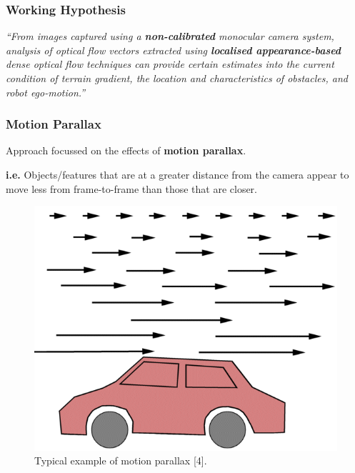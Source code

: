 \documentclass[10pt, compress]{beamer}
\begin{document}

\begin{frame}[fragile]
  \frametitle{Working Hypothesis}

	\hspace*{20pt} \textit{``From images captured using a \textbf{non-calibrated} monocular camera system, analysis of optical flow vectors extracted using \textbf{localised appearance-based} dense optical flow techniques can provide certain estimates into the current condition of terrain gradient, the location and characteristics of obstacles, and robot ego-motion.''}

\end{frame}

\begin{frame}[fragile]
  \frametitle{Motion Parallax}

  Approach focussed on the effects of \textbf{motion parallax}. \\ \vspace{0.5cm}
  
  \textbf{i.e.} Objects/features that are at a greater distance from the camera appear to  move less from frame-to-frame than those that are closer.
  
\begin{figure}[ht!]
\centering
\includegraphics[scale=0.2]{motion_parallax.png}
    \caption{Typical example of motion parallax [4].}
  \end{figure}
  
\end{frame}
\end{document}
